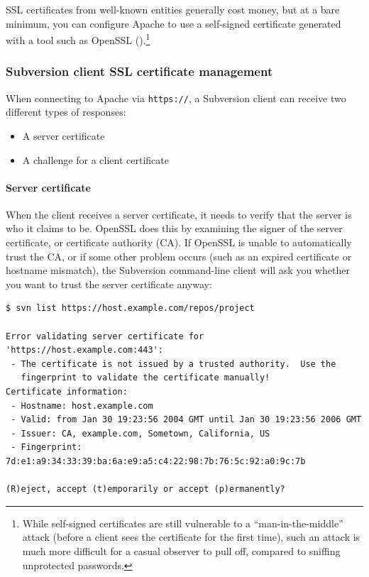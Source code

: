 SSL certificates from well-known entities generally cost money, but at a
bare minimum, you can configure Apache to use a self-signed certificate
generated with a tool such as OpenSSL
(\href{https://www.openssl.org}{}).\footnote{While self-signed
  certificates are still vulnerable to a ``man-in-the-middle'' attack
  (before a client sees the certificate for the first time), such an
  attack is much more difficult for a casual observer to pull off,
  compared to sniffing unprotected passwords.}

\subsubsection{Subversion client SSL certificate
management}\label{svn.serverconfig.httpd.ssl.client}

When connecting to Apache via \texttt{https://}, a Subversion client can
receive two different types of responses:

\begin{itemize}
\item
  A server certificate
\item
  A challenge for a client certificate
\end{itemize}

\paragraph{Server
certificate}\label{svn.serverconfig.httpd.ssl.client.servercert}

When the client receives a server certificate, it needs to verify that
the server is who it claims to be. OpenSSL does this by examining the
signer of the server certificate, or certificate authority (CA). If
OpenSSL is unable to automatically trust the CA, or if some other
problem occurs (such as an expired certificate or hostname mismatch),
the Subversion command-line client will ask you whether you want to
trust the server certificate anyway:

\begin{verbatim}
$ svn list https://host.example.com/repos/project

Error validating server certificate for 'https://host.example.com:443':
 - The certificate is not issued by a trusted authority.  Use the
   fingerprint to validate the certificate manually!
Certificate information:
 - Hostname: host.example.com
 - Valid: from Jan 30 19:23:56 2004 GMT until Jan 30 19:23:56 2006 GMT
 - Issuer: CA, example.com, Sometown, California, US
 - Fingerprint: 7d:e1:a9:34:33:39:ba:6a:e9:a5:c4:22:98:7b:76:5c:92:a0:9c:7b

(R)eject, accept (t)emporarily or accept (p)ermanently?
\end{verbatim}

